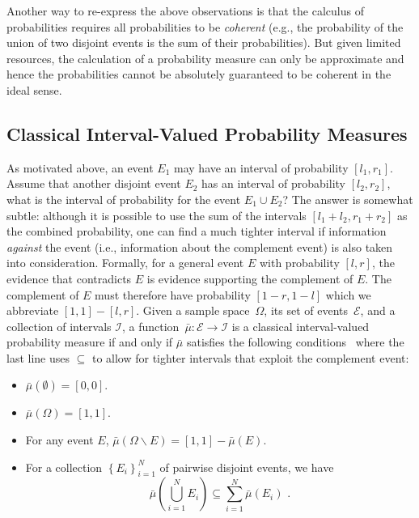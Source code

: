 \documentclass[12pt]{iopart}
\theoremstyle{plain}
\theoremstyle{definition}
\newcommand{\events}{\ensuremath{\mathcal{E}}}
\begin{document}
Another way to re-express the above observations is that the calculus
of probabilities requires all probabilities to be \emph{coherent}
(e.g., the probability of the union of two disjoint events is the sum
of their probabilities). But given limited resources, the calculation
of a probability measure can only be approximate and hence the
probabilities cannot be absolutely guaranteed to be coherent in the
ideal sense. 

\subsection{Classical Interval-Valued Probability Measures}

As motivated above, an event $E_{1}$ may have an interval of probability
$[l_{1},r_{1}]$. Assume that another disjoint event $E_{2}$ has
an interval of probability $[l_{2},r_{2}]$, what is the interval
of probability for the event $E_{1}\cup E_{2}$? The answer is somewhat
subtle: although it is possible to use the sum of the intervals $[l_{1}+l_{2},r_{1}+r_{2}]$
as the combined probability, one can find a much tighter interval
if information \emph{against} the event (i.e., information about the
complement event) is also taken into consideration. Formally, for
a general event $E$ with probability $[l,r]$, the evidence that
contradicts $E$ is evidence supporting the complement of $E$. The
complement of $E$ must therefore have probability $\left[1-r,1-l\right]$
which we abbreviate $\left[1,1\right]-\left[l,r\right]$. Given a
sample space~$\Omega$, its set of events~$\events$, and a collection
of intervals $\mathscr{I}$, a function~$\bar{\mu}:\events\rightarrow\mathscr{I}$
is a classical interval-valued probability measure if and only if
$\bar{\mu}$ satisfies the following conditions~\cite{JamisonLodwick2004}
where the last line uses $\subseteq$ to allow for tighter intervals
that exploit the complement event: 
\begin{itemize}
\item $\bar{\mu}(\emptyset)=[0,0]$. 
\item $\bar{\mu}(\Omega)=[1,1]$. 
\item For any event $E$, $\bar{\mu}\left(\Omega\backslash
E\right)=\left[1,1\right]-\bar{\mu}\left(E\right)$.
\item For a collection $\left\{ E_{i}\right\} _{i=1}^{N}$ of pairwise disjoint
events, we have 
\begin{equation}
\bar{\mu}\left(\bigcup_{i=1}^{N}E_{i}\right)\subseteq\sum_{i=1}^{N}\bar{\mu}\left(E_{i}\right)\textrm{ .}\label{eq:classical-include}
\end{equation}
\end{itemize}
\end{document}
